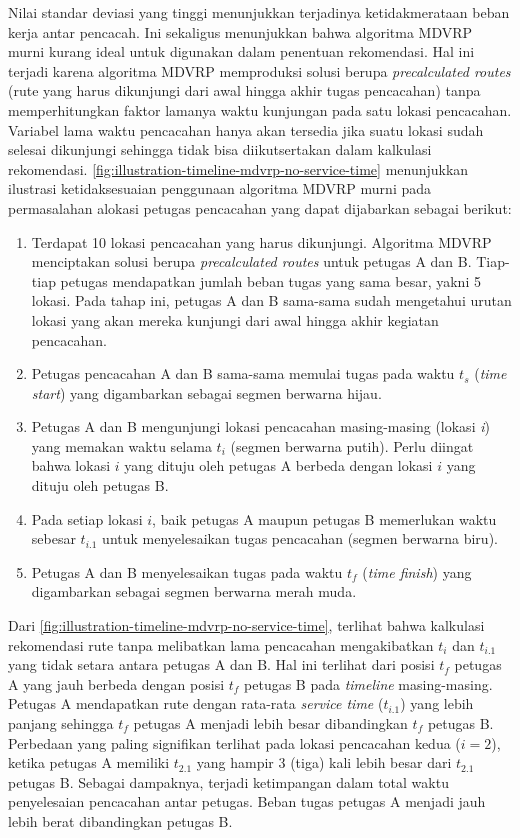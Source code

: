 Nilai standar deviasi yang tinggi menunjukkan terjadinya ketidakmerataan beban kerja antar pencacah. Ini sekaligus menunjukkan bahwa algoritma MDVRP murni kurang ideal untuk digunakan dalam penentuan rekomendasi. Hal ini terjadi karena algoritma MDVRP memproduksi solusi berupa \textit{precalculated routes} (rute yang harus dikunjungi dari awal hingga akhir tugas pencacahan) tanpa memperhitungkan faktor lamanya waktu kunjungan pada satu lokasi pencacahan. Variabel lama waktu pencacahan hanya akan tersedia jika suatu lokasi sudah selesai dikunjungi sehingga tidak bisa diikutsertakan dalam kalkulasi rekomendasi. \autoref{fig:illustration-timeline-mdvrp-no-service-time} menunjukkan ilustrasi ketidaksesuaian penggunaan algoritma MDVRP murni pada permasalahan alokasi petugas pencacahan yang dapat dijabarkan sebagai berikut:
\begin{enumerate}
	\item Terdapat 10 lokasi pencacahan yang harus dikunjungi. Algoritma MDVRP menciptakan solusi berupa \textit{precalculated routes} untuk petugas A dan B. Tiap-tiap petugas mendapatkan jumlah beban tugas yang sama besar, yakni 5 lokasi. Pada tahap ini, petugas A dan B sama-sama sudah mengetahui urutan lokasi yang akan mereka kunjungi dari awal hingga akhir kegiatan pencacahan. 
	\item Petugas pencacahan A dan B sama-sama memulai tugas pada waktu $t_{s}$ (\textit{time start}) yang digambarkan sebagai segmen berwarna hijau.
	\item Petugas A dan B mengunjungi lokasi pencacahan masing-masing (lokasi \textit{i}) yang memakan waktu selama $t_{i}$ (segmen berwarna putih). Perlu diingat bahwa lokasi $i$ yang dituju oleh petugas A berbeda dengan lokasi $i$ yang dituju oleh petugas B.
	\item Pada setiap lokasi $i$, baik petugas A maupun petugas B memerlukan waktu sebesar $t_{i.1}$ untuk menyelesaikan tugas pencacahan (segmen berwarna biru).  
	\item Petugas A dan B menyelesaikan tugas pada waktu $t_{f}$ (\textit{time finish}) yang digambarkan sebagai segmen berwarna merah muda. 
\end{enumerate}

Dari \autoref{fig:illustration-timeline-mdvrp-no-service-time}, terlihat bahwa kalkulasi rekomendasi rute tanpa melibatkan lama pencacahan mengakibatkan $t_{i}$ dan $t_{i.1}$ yang tidak setara antara petugas A dan B. Hal ini terlihat dari posisi $t_{f}$ petugas A yang jauh berbeda dengan posisi $t_{f}$ petugas B pada \textit{timeline} masing-masing. Petugas A mendapatkan rute dengan rata-rata \textit{service time} ($t_{i.1}$) yang lebih panjang sehingga $t_{f}$ petugas A menjadi lebih besar dibandingkan $t_{f}$ petugas B. Perbedaan yang paling signifikan terlihat pada lokasi pencacahan kedua ($i = 2$), ketika petugas A memiliki $t_{2.1}$ yang hampir 3 (tiga) kali lebih besar dari $t_{2.1}$ petugas B. Sebagai dampaknya, terjadi ketimpangan dalam total waktu penyelesaian pencacahan antar petugas. Beban tugas petugas A menjadi jauh lebih berat dibandingkan petugas B. 

